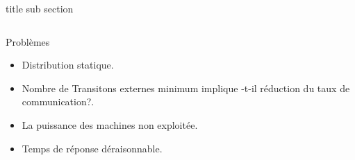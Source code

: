 \begin{frame}{title sub section}
\begin{columns}
	      	\begin{column}{0.7\textwidth}
	      		\begin{block}{Problèmes}
	      			\begin{itemize}
	      				\item Distribution statique.%
	      				\item Nombre de Transitons externes minimum implique -t-il réduction du taux de communication?.%
	      				
	      				\item La puissance des machines non exploitée.%
	      				\item Temps de réponse déraisonnable.
	      			\end{itemize}
	      		\end{block}
	      	\end{column}
      	\end{columns}	    
\end{frame}

